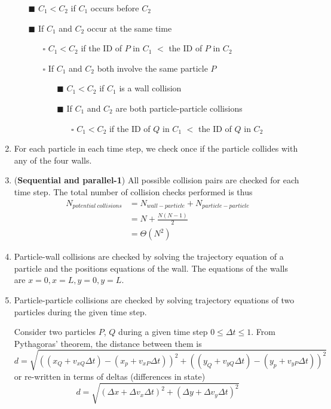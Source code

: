 \documentclass[12pt]{article}
\begin{document}
\begin{enumerate}
	\begin{itemize}
		\item[$\blacksquare$] $C_1 < C_2$ if $C_1$ occurs before $C_2$
		\item[$\blacksquare$] If $C_1$ and $C_2$ occur at the same time
		\begin{itemize}
			\item[$\square$] $C_1 < C_2$ if the ID of $P$ in $C_1$ $<$ the ID of $P$ in $C_2$
			\item[$\square$] If $C_1$ and $C_2$ both involve the same particle $P$
				\begin{itemize}
					\item[$\blacksquare$] $C_1 < C_2$ if $C_1$ is a wall collision
					\item[$\blacksquare$] If $C_1$ and $C_2$ are both particle-particle collisions
						\begin{itemize}
							\item[$\square$] $C_1 < C_2$ if the ID of $Q$ in $C_1$ $<$ the ID of $Q$ in $C_2$
						\end{itemize}
				\end{itemize}
		\end{itemize}
	\end{itemize}
	\item For each particle in each time step, we check once if the particle collides with any of the four walls.
	\item (\textbf{Sequential and parallel-1}) All possible collision pairs are checked for each time step. The total number of collision checks performed is thus
	\begin{align*}
	N_{potential\ collisions} 	&= N_{wall-particle} + N_{particle-particle} \\
						&= N + \frac{N(N-1)}{2} \\
						&= \Theta (N^2)
	\end{align*}
	\item Particle-wall collisions are checked by solving the trajectory equation of a particle and the positions equations of the wall. The equations of the walls are $x = 0, x = L, y = 0, y = L$.
	\item \label{trajectory-calc} Particle-particle collisions are checked by solving trajectory equations of two particles during the given time step.
	
	Consider two particles $P$, $Q$ during a given time step $0 \leq \Delta t \leq 1$. From Pythagoras’ theorem, the distance between them is
	$$d = \sqrt{\left( \left( x_Q + v_{xQ} \Delta t \right) - \left( x_p + v_{xP} \Delta t \right) \right)^2 +
		\left( \left( y_Q + v_{yQ} \Delta t \right) - \left( y_p + v_{yP} \Delta t \right) \right)^2}$$
	or re-written in terms of deltas (differences in state)
	$$d = \sqrt{\left( \Delta x + \Delta v_x \Delta t \right)^2 +
		\left( \Delta y + \Delta v_y \Delta t \right)^2}$$
		

\end{enumerate}
\end{document}
